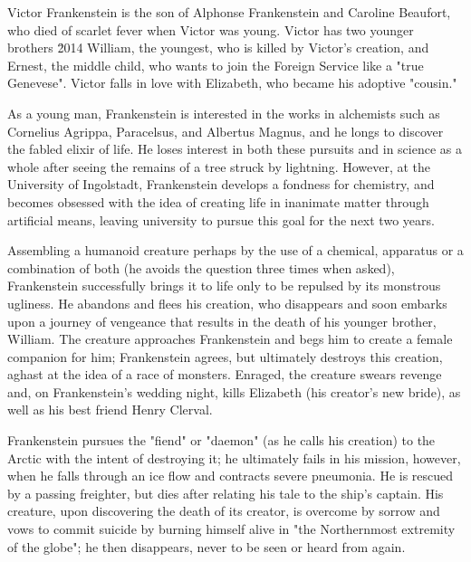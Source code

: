 \documentclass[12pt]{report}    %
\theoremstyle{definition}
\theoremstyle{remark}
\begin{document}
\begin{vita}
Victor Frankenstein is the son of Alphonse Frankenstein and Caroline Beaufort, who died of scarlet fever when Victor was young. Victor has two younger brothers \u2014 William, the youngest, who is killed by Victor's creation, and Ernest, the middle child, who wants to join the Foreign Service like a "true Genevese". Victor falls in love with Elizabeth, who became his adoptive "cousin."

As a young man, Frankenstein is interested in the works in alchemists such as Cornelius Agrippa, Paracelsus, and Albertus Magnus, and he longs to discover the fabled elixir of life. He loses interest in both these pursuits and in science as a whole after seeing the remains of a tree struck by lightning. However, at the University of Ingolstadt, Frankenstein develops a fondness for chemistry, and becomes obsessed with the idea of creating life in inanimate matter through artificial means, leaving university to pursue this goal for the next two years.

Assembling a humanoid creature perhaps by the use of a chemical, apparatus or a combination of both (he avoids the question three times when asked), Frankenstein successfully brings it to life only to be repulsed by its monstrous ugliness. He abandons and flees his creation, who disappears and soon embarks upon a journey of vengeance that results in the death of his younger brother, William. The creature approaches Frankenstein and begs him to create a female companion for him; Frankenstein agrees, but ultimately destroys this creation, aghast at the idea of a race of monsters. Enraged, the creature swears revenge and, on Frankenstein's wedding night, kills Elizabeth (his creator's new bride), as well as his best friend Henry Clerval.

Frankenstein pursues the "fiend" or "daemon" (as he calls his creation) to the Arctic with the intent of destroying it; he ultimately fails in his mission, however, when he falls through an ice flow and contracts severe pneumonia. He is rescued by a passing freighter, but dies after relating his tale to the ship's captain. His creature, upon discovering the death of its creator, is overcome by sorrow and vows to commit suicide by burning himself alive in "the Northernmost extremity of the globe"; he then disappears, never to be seen or heard from again.
\end{vita}
\end{document}
